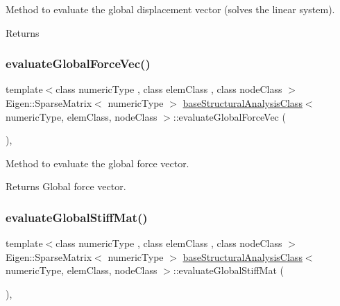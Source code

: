Method to evaluate the global displacement vector (solves the linear system). \begin{DoxyReturn}{Returns}

\end{DoxyReturn}
\mbox{\label{classbase_structural_analysis_class_a7cfa00b107c0014bbc7f364791949ef6}} 
\subsubsection{\texorpdfstring{evaluate\+Global\+Force\+Vec()}{evaluateGlobalForceVec()}}
{\footnotesize\ttfamily template$<$class numeric\+Type , class elem\+Class , class node\+Class $>$ \\
Eigen\+::\+Sparse\+Matrix$<$ numeric\+Type $>$ \mbox{\hyperlink{classbase_structural_analysis_class}{base\+Structural\+Analysis\+Class}}$<$ numeric\+Type, elem\+Class, node\+Class $>$\+::evaluate\+Global\+Force\+Vec (\begin{DoxyParamCaption}{ }\end{DoxyParamCaption})\hspace{0.3cm}{\ttfamily [protected]}, {\ttfamily [virtual]}}

Method to evaluate the global force vector. \begin{DoxyReturn}{Returns}
Global force vector. 
\end{DoxyReturn}
\mbox{\label{classbase_structural_analysis_class_a773fa080feae6b17e47e58e5ed810885}} 
\subsubsection{\texorpdfstring{evaluate\+Global\+Stiff\+Mat()}{evaluateGlobalStiffMat()}}
{\footnotesize\ttfamily template$<$class numeric\+Type , class elem\+Class , class node\+Class $>$ \\
Eigen\+::\+Sparse\+Matrix$<$ numeric\+Type $>$ \mbox{\hyperlink{classbase_structural_analysis_class}{base\+Structural\+Analysis\+Class}}$<$ numeric\+Type, elem\+Class, node\+Class $>$\+::evaluate\+Global\+Stiff\+Mat (\begin{DoxyParamCaption}{ }\end{DoxyParamCaption})\hspace{0.3cm}{\ttfamily [protected]}, {\ttfamily [virtual]}}

